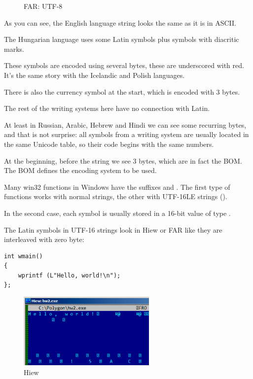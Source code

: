 \begin{figure}[H]
\centering
{}
\caption{FAR: UTF-8}
\end{figure}

As you can see, the English language string looks the same as it is in ASCII.

The Hungarian language uses some Latin symbols plus symbols with diacritic marks.

These symbols are encoded using several bytes, these are underscored with red.
It's the same story with the Icelandic and Polish languages.

There is also the  currency symbol at the start, which is encoded with 3 bytes.

The rest of the writing systems here have no connection with Latin.

At least in Russian, Arabic, Hebrew and Hindi we can see some recurring bytes, and that is not surprise:
all symbols from a writing system are usually located in the same Unicode table, so their code begins with
the same numbers.

At the beginning, before the  string we see 3 bytes, which are in fact the \ac{BOM}.
The \ac{BOM} defines the encoding system to be
used.


Many win32 functions in Windows have the suffixes  and .
The first type of functions works
with normal strings, the other with UTF-16LE strings ().

In the second case, each symbol is usually stored in a 16-bit value of type .

The Latin symbols in UTF-16 strings look in Hiew or FAR like they are interleaved with zero byte:

\begin{lstlisting}
int wmain()
{
	wprintf (L"Hello, world!\n");
};
\end{lstlisting}

\begin{figure}[H]
\centering
\includegraphics[width=0.6\textwidth]{digging_into_code/strings/UTF16-string.png}
\caption{Hiew}
\end{figure}


